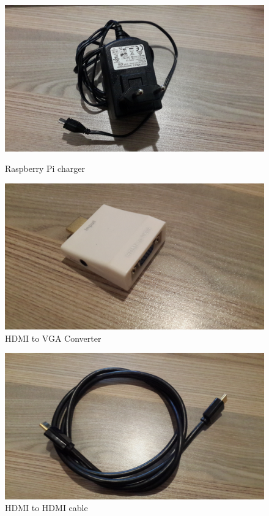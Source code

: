 \begin{figure}[ht!]
\centering
\begin{minipage}{.5\textwidth}
  \centering
 \includegraphics[width=0.9\linewidth]{../images/manual/charger.jpg}
  \caption{ Raspberry Pi charger}

\end{minipage}%
\begin{minipage}{.5\textwidth}
  \centering
  \includegraphics[width=0.9\linewidth]{../images/manual/converter.jpg}
  \caption{ HDMI to VGA Converter}
\end{minipage}
\end{figure}




\begin{figure}[ht!]
\centering
\begin{minipage}{.5\textwidth}
  \centering
 \includegraphics[width=0.9\linewidth]{../images/manual/cable.jpg}
  \caption{ HDMI to HDMI cable}
\end{minipage}
\end{figure}
